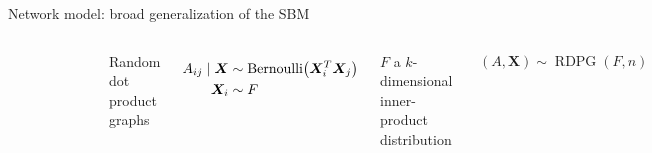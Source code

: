 \documentclass{beamer}
\theoremstyle{remark}
\newcommand{\X}{\bm X}
\newcommand{\RDPG}{\operatorname{RDPG}}
\newcommand \cond {\mid}
\newcommand \dist {\sim}
\DeclarePairedDelimiter{\paren}{(}{)}
\begin{document}
\begin{frame}{Network model: broad generalization of the SBM}
    \begin{columns}

        \begin{figure}
            \includegraphics[width=\textwidth]{figures/assortative.png}
        \end{figure}


        Random dot product graphs

        \begin{align*}
            A_{ij} \cond \X & \dist \mathrm{Bernoulli} \paren*{\X_i^T \X_j} \\
            \X_i            & \dist F
        \end{align*}

        $F$ a $k$-dimensional inner-product distribution

        \begin{align*}
            (A, \X) \dist \RDPG(F,n)
        \end{align*}

    \end{columns}
\end{frame}
\end{document}
